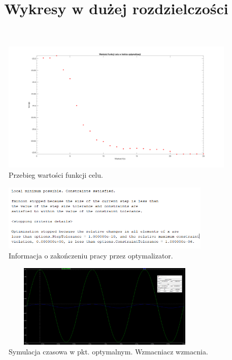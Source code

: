 \documentclass{article}
\begin{document}
\begin{figure}[h]
	\includegraphics[width=12cm]{graphics/fval.png}
	\centering
	\caption{Przebieg wartości funkcji celu.}
\end{figure}

\begin{figure}[h]
	\includegraphics[width=10cm]{graphics/exit_msg.png}
	\centering
	\caption{Informacja o zakończeniu pracy przez optymalizator.}
\end{figure}


\begin{figure}[h]
	\includegraphics[width=10cm,height=4cm]{graphics/optim_tran.png}
	\centering
	\caption{Symulacja czasowa w pkt. optymalnym. Wzmacniacz wzmacnia.}
\end{figure}


\pagebreak










\clearpage
\begin{center}
	\title{ \huge \textbf{Wykresy w dużej rozdzielczości}}
\end{center}
\end{document}
